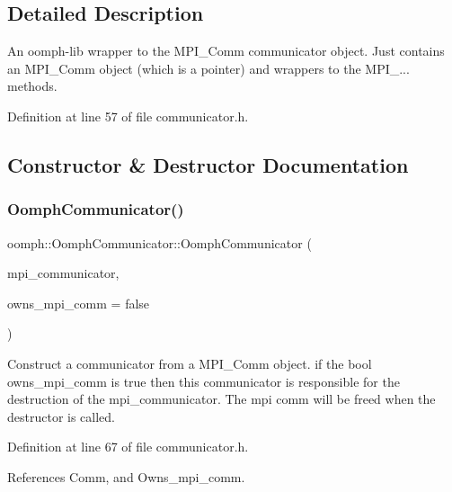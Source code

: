 \subsection{Detailed Description}
An oomph-\/lib wrapper to the M\+P\+I\+\_\+\+Comm communicator object. Just contains an M\+P\+I\+\_\+\+Comm object (which is a pointer) and wrappers to the M\+P\+I\+\_\+... methods. 

Definition at line 57 of file communicator.\+h.



\subsection{Constructor \& Destructor Documentation}
\mbox{\label{classoomph_1_1OomphCommunicator_af94e5be435b9cf1b01bed6242a5e46fe}} 
\subsubsection{\texorpdfstring{Oomph\+Communicator()}{OomphCommunicator()}\hspace{0.1cm}{\footnotesize\ttfamily [1/2]}}
{\footnotesize\ttfamily oomph\+::\+Oomph\+Communicator\+::\+Oomph\+Communicator (\begin{DoxyParamCaption}\item[{const M\+P\+I\+\_\+\+Comm}]{mpi\+\_\+communicator,  }\item[{const bool \&}]{owns\+\_\+mpi\+\_\+comm = {\ttfamily false} }\end{DoxyParamCaption})\hspace{0.3cm}{\ttfamily [inline]}}

Construct a communicator from a M\+P\+I\+\_\+\+Comm object. if the bool owns\+\_\+mpi\+\_\+comm is true then this communicator is responsible for the destruction of the mpi\+\_\+communicator. The mpi comm will be freed when the destructor is called. 

Definition at line 67 of file communicator.\+h.



References Comm, and Owns\+\_\+mpi\+\_\+comm.

\mbox{\label{classoomph_1_1OomphCommunicator_a494598d5d4b772ad78e5d588d00d2d5a}} 
